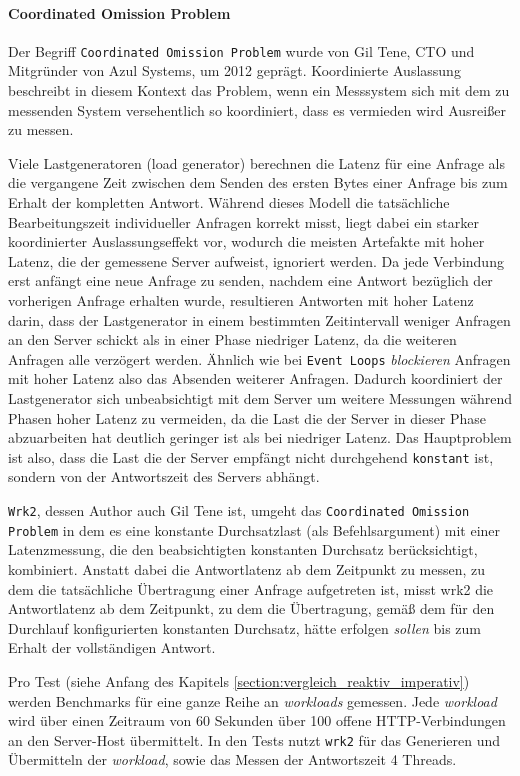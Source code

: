 \paragraph{Coordinated Omission Problem}
Der Begriff \verb|Coordinated Omission Problem| wurde von Gil Tene, CTO und Mitgründer von Azul Systems, um 2012 geprägt.
Koordinierte Auslassung beschreibt in diesem Kontext das Problem, wenn ein Messsystem sich mit dem zu messenden System versehentlich so koordiniert,
dass es vermieden wird Ausreißer zu messen.

Viele Lastgeneratoren (load generator) berechnen die Latenz für eine Anfrage als die vergangene Zeit zwischen dem Senden des ersten Bytes einer Anfrage
bis zum Erhalt der kompletten Antwort. Während dieses Modell die tatsächliche Bearbeitungszeit individueller Anfragen korrekt misst,
liegt dabei ein starker koordinierter Auslassungseffekt vor,
wodurch die meisten Artefakte mit hoher Latenz, die der gemessene Server aufweist, ignoriert werden.
Da jede Verbindung erst anfängt eine neue Anfrage zu senden, nachdem eine Antwort bezüglich der vorherigen Anfrage erhalten wurde,
resultieren Antworten mit hoher Latenz darin, dass der Lastgenerator in einem bestimmten Zeitintervall weniger Anfragen an den Server schickt als in einer
Phase niedriger Latenz, da die weiteren Anfragen alle verzögert werden. Ähnlich wie bei \verb|Event Loops| \textit{blockieren}
Anfragen mit hoher Latenz also das Absenden weiterer Anfragen.
Dadurch koordiniert der Lastgenerator sich unbeabsichtigt mit dem Server um weitere Messungen während Phasen hoher Latenz zu vermeiden, da die Last die der Server
in dieser Phase abzuarbeiten hat deutlich geringer ist als bei niedriger Latenz. Das Hauptproblem ist also, dass die Last die der Server empfängt
nicht durchgehend \verb|konstant| ist, sondern von der Antwortszeit des Servers abhängt. \parencite{mci/Friedrich2017}

\verb|Wrk2|, dessen Author auch Gil Tene ist, umgeht das \verb|Coordinated Omission Problem| in dem es eine konstante Durchsatzlast (als Befehlsargument) mit
einer Latenzmessung, die den beabsichtigten konstanten Durchsatz berücksichtigt, kombiniert. Anstatt dabei die Antwortlatenz ab dem Zeitpunkt zu messen,
zu dem die tatsächliche Übertragung einer Anfrage aufgetreten ist, misst wrk2 die Antwortlatenz ab dem Zeitpunkt, zu dem die Übertragung,
gemäß dem für den Durchlauf konfigurierten konstanten Durchsatz, hätte erfolgen \textit{sollen} bis zum Erhalt der vollständigen Antwort.\parencite{Wrk2}

Pro Test (siehe Anfang des Kapitels \ref{section:vergleich_reaktiv_imperativ}) werden Benchmarks für eine ganze Reihe an \textit{workloads} gemessen.
Jede \textit{workload} wird über einen Zeitraum von 60 Sekunden über 100 offene HTTP-Verbindungen an den Server-Host übermittelt.
In den Tests nutzt \verb|wrk2| für das Generieren und Übermitteln der \textit{workload}, sowie das Messen der Antwortszeit
4 Threads.

